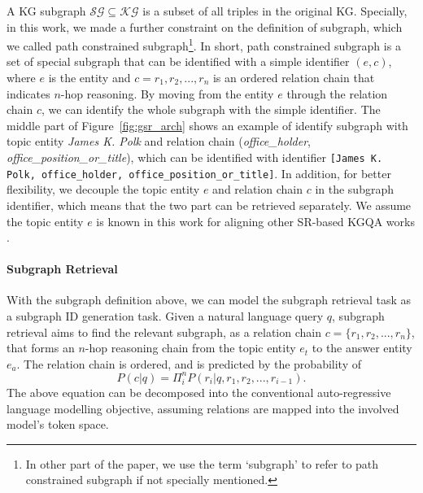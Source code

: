 \documentclass[11pt]{article}
\begin{document}
A KG subgraph $\mathcal{SG}\subseteq\mathcal{KG}$ is a subset of all triples in the original KG. Specially, in this work, we made a further constraint on the definition of subgraph, which we called path constrained subgraph\footnote{In other part of the paper, we use the term `subgraph' to refer to path constrained subgraph if not specially mentioned.}. In short, path constrained subgraph is a set of special subgraph that can be identified with a simple identifier $(e, c)$, where $e$ is the entity and $c=r_1, r_2, ..., r_n$ is an ordered relation chain that indicates $n$-hop reasoning. By moving from the entity $e$ through the relation chain $c$, we can identify the whole subgraph with the simple identifier.
The middle part of Figure~\ref{fig:gsr_arch} shows an example of identify subgraph with topic entity \textit{James K. Polk} and relation chain (\textit{office\_holder}, \textit{office\_position\_or\_title}), which can be identified with identifier \texttt{[James K. Polk, office\_holder, office\_position\_or\_title]}. In addition, for better flexibility, we decouple the topic entity $e$ and relation chain $c$ in the subgraph identifier, which means that the two part can be retrieved separately. We assume the topic entity $e$ is known in this work for aligning other SR-based KGQA works \citep{zhang-etal-2022-subgraph, luo2024reasoning}. 


\paragraph{Subgraph Retrieval}
With the subgraph definition above, we can model the subgraph retrieval task as a subgraph ID generation task. Given a natural language query $q$, subgraph retrieval aims to find the relevant subgraph, as a relation chain $c=\{r_1, r_2, ..., r_n\}$, that forms an $n$-hop reasoning chain from the topic entity $e_t$ to the answer entity $e_a$. The relation chain is ordered, and is predicted by the probability of 
\begin{equation*}
    P(c|q) = \Pi_i^nP(r_i|q, r_1, r_2, ..., r_{i-1}).
    \label{equ:subgraph_retrieval}
\end{equation*}
The above equation can be decomposed into the conventional auto-regressive language modelling objective, assuming relations are mapped into the involved model's token space. 
\end{document}
